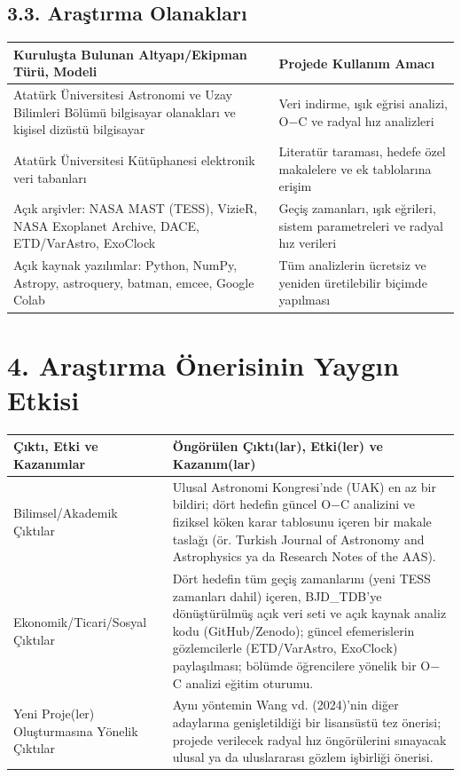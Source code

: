 \subsection*{3.3. Araştırma Olanakları}
\begin{center}
\small
\begin{tabularx}{\textwidth}{>{\raggedright\arraybackslash}X >{\raggedright\arraybackslash}X}
\toprule
Kuruluşta Bulunan Altyapı/Ekipman Türü, Modeli & Projede Kullanım Amacı\\
\midrule
Atatürk Üniversitesi Astronomi ve Uzay Bilimleri Bölümü bilgisayar olanakları ve kişisel dizüstü bilgisayar & Veri indirme, ışık eğrisi analizi, O$-$C ve radyal hız analizleri\\
Atatürk Üniversitesi Kütüphanesi elektronik veri tabanları & Literatür taraması, hedefe özel makalelere ve ek tablolarına erişim\\
Açık arşivler: NASA MAST (TESS), VizieR, NASA Exoplanet Archive, DACE, ETD/VarAstro, ExoClock & Geçiş zamanları, ışık eğrileri, sistem parametreleri ve radyal hız verileri\\
Açık kaynak yazılımlar: Python, NumPy, Astropy, astroquery, batman, emcee, Google Colab & Tüm analizlerin ücretsiz ve yeniden üretilebilir biçimde yapılması\\
\bottomrule
\end{tabularx}
\end{center}

\section*{4. Araştırma Önerisinin Yaygın Etkisi}
\begin{center}
\small
\begin{tabularx}{\textwidth}{>{\raggedright\arraybackslash}p{4.2cm} >{\raggedright\arraybackslash}X}
\toprule
Çıktı, Etki ve Kazanımlar & Öngörülen Çıktı(lar), Etki(ler) ve Kazanım(lar)\\
\midrule
Bilimsel/Akademik Çıktılar & Ulusal Astronomi Kongresi'nde (UAK) en az bir bildiri; dört hedefin güncel O$-$C analizini ve fiziksel köken karar tablosunu içeren bir makale taslağı (ör. Turkish Journal of Astronomy and Astrophysics ya da Research Notes of the AAS).\\
Ekonomik/Ticari/Sosyal Çıktılar & Dört hedefin tüm geçiş zamanlarını (yeni TESS zamanları dahil) içeren, BJD\_TDB'ye dönüştürülmüş açık veri seti ve açık kaynak analiz kodu (GitHub/Zenodo); güncel efemerislerin gözlemcilerle (ETD/VarAstro, ExoClock) paylaşılması; bölümde öğrencilere yönelik bir O$-$C analizi eğitim oturumu.\\
Yeni Proje(ler) Oluşturmasına Yönelik Çıktılar & Aynı yöntemin Wang vd. (2024)'nin diğer adaylarına genişletildiği bir lisansüstü tez önerisi; projede verilecek radyal hız öngörülerini sınayacak ulusal ya da uluslararası gözlem işbirliği önerisi.\\
\bottomrule
\end{tabularx}
\end{center}

